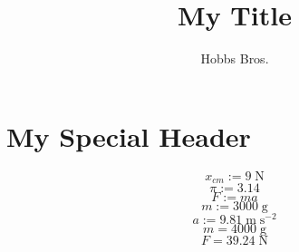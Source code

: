 \documentclass[12pt]{article}
\begin{document}
\title{My Title}
\author{Hobbs Bros.}
\maketitle


\section{My Special Header}


$$
x_{cm} := 9 \; \mathrm{N}
$$
$$
\pi := 3.14
$$
$$
F := m a
$$
$$
m := 3000 \; \mathrm{g}
$$
$$
a := 9.81 \; \mathrm{m} \; \mathrm{s^{-2}}
$$
$$
m = 4000 \; \mathrm{g}
$$
$$
F = 39.24 \; \mathrm{N}
$$
\end{document}
